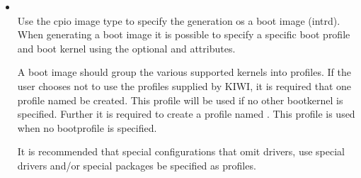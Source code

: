 \begin{itemize}
\pagebreak[3]
\item {}\\
      Use the cpio image type to specify the generation os a boot image
      (intrd). When generating a boot image it is possible to specify a
      specific boot profile and boot kernel using the optional
       and 
      attributes.
      
      A boot image should group the various supported kernels into profiles. 
      If the user chooses not to use the profiles supplied by KIWI, it is
      required that one profile named  be created. This profile
      will be used if no other bootkernel is specified. Further it is 
      required to create a  profile named . This profile is
      used when no bootprofile is specified.

      It is recommended that special configurations that omit drivers, use
      special drivers and/or special packages be specified as profiles.



\end{itemize}
